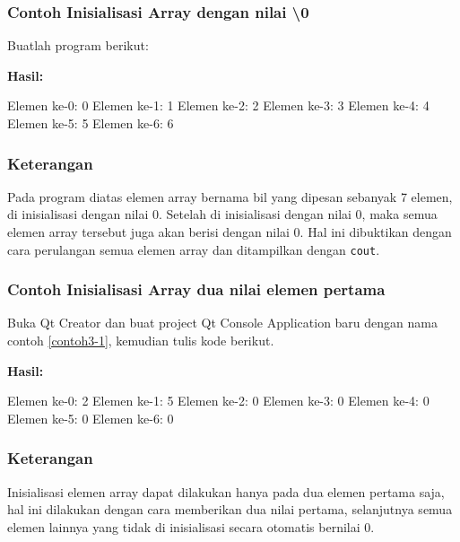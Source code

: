 \subsubsection*{Contoh Inisialisasi Array dengan nilai \textbackslash{}0}

Buatlah program berikut:



\textbf{Hasil:}

\begin{lcverbatim}
Elemen ke-0: 0
Elemen ke-1: 1
Elemen ke-2: 2
Elemen ke-3: 3
Elemen ke-4: 4
Elemen ke-5: 5
Elemen ke-6: 6
\end{lcverbatim}

\subsubsection*{Keterangan}

Pada program diatas elemen array bernama bil yang dipesan sebanyak 7
elemen, di inisialisasi dengan nilai 0. Setelah di inisialisasi dengan
nilai 0, maka semua elemen array tersebut juga akan berisi dengan nilai
0. Hal ini dibuktikan dengan cara perulangan semua elemen array dan
ditampilkan dengan \texttt{cout}.

\subsubsection*{Contoh Inisialisasi Array dua nilai elemen pertama}

Buka Qt Creator dan buat project Qt Console Application baru dengan
nama contoh \ref{contoh3-1}, kemudian tulis kode berikut.



\textbf{Hasil:}

\begin{lcverbatim}
Elemen ke-0: 2
Elemen ke-1: 5
Elemen ke-2: 0
Elemen ke-3: 0
Elemen ke-4: 0
Elemen ke-5: 0
Elemen ke-6: 0
\end{lcverbatim}

\subsubsection*{Keterangan}

Inisialisasi elemen array dapat dilakukan hanya pada dua elemen pertama
saja, hal ini dilakukan dengan cara memberikan dua nilai pertama,
selanjutnya semua elemen lainnya yang tidak di inisialisasi secara
otomatis bernilai 0.

